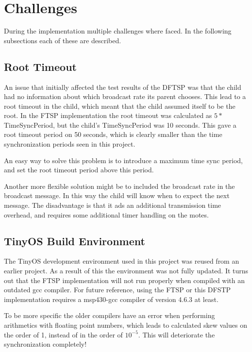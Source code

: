 \documentclass[Main]{subfiles}
\begin{document}
\section{Challenges} %
\label{sec:challenges}

	During the implementation multiple challenges where faced. In the following subsections each of these are described.

	\subsection{Root Timeout} %
	\label{sub:root_timeout}
		An issue that initially affected the test results of the DFTSP was that the child had no information about which broadcast rate its parent chooses. 
		This lead to a root timeout in the child, which meant that the child assumed itself to be the root. 
		In the FTSP implementation the root timeout was calculated as $5*$TimeSyncPeriod, but the child's TimeSyncPeriod was 10 seconds. This gave a root timeout period on 50 seconds, which is clearly smaller than the time synchronization periods seen in this project.

		An easy way to solve this problem is to introduce a maximum time sync period, and set the root timeout period above this period.

		Another more flexible solution might be to included the broadcast rate in the broadcast message. 
		In this way the child will know when to expect the next message.
		The disadvantage is that it ads an additional transmission time overhead, and requires some additional timer handling on the motes.

	\subsection{TinyOS Build Environment} %
	\label{sub:tinyos_build_environment}
		The TinyOS development environment used in this project was reused from an earlier project. 
		As a result of this the environment was not fully updated.
		It turns out that the FTSP implementation will not run properly when compiled with an outdated gcc compiler.
		For future reference, using the FTSP or this DFSTP implementation requires a msp430-gcc compiler of version 4.6.3 at least.

		To be more specific the older compilers have an error when performing arithmetics with floating point numbers, which leads to calculated skew values on the order of 1, instead of in the order of $10^{-5}$.
		This will deteriorate the synchronization completely! 

\end{document}

